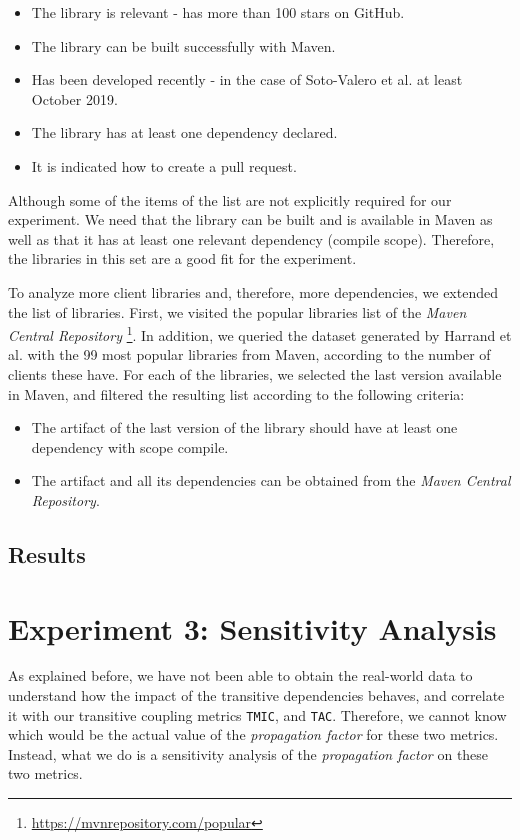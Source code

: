\begin{itemize}
  \item The library is relevant - has more than 100 stars on GitHub.
  \item The library can be built successfully with Maven.
  \item Has been developed recently - in the case of Soto-Valero et al. at least October 2019.
  \item The library has at least one dependency declared.
  \item It is indicated how to create a pull request.
\end{itemize}

Although some of the items of the list are not explicitly required for our experiment. We need that the library can be built and is available in Maven as well as that it has at least one relevant dependency (compile scope). Therefore, the libraries in this set are a good fit for the experiment.

To analyze more client libraries and, therefore, more dependencies, we extended the list of libraries. First, we visited the popular libraries list of the \textit{Maven Central Repository} \footnote{\url{https://mvnrepository.com/popular}}. In addition, we queried the dataset generated by Harrand et al. \cite{Harrand2019} with the 99 most popular libraries from Maven, according to the number of clients these have. For each of the libraries, we selected the last version available in Maven, and filtered the resulting list according to the following criteria:

\begin{itemize}
  \item The artifact of the last version of the library should have at least one dependency with scope compile.
  \item The artifact and all its dependencies can be obtained from the \textit{Maven Central Repository}.
\end{itemize}


\subsection{Results}

\section{Experiment 3: Sensitivity Analysis}
As explained before, we have not been able to obtain the real-world data to understand how the impact of the transitive dependencies behaves, and correlate it with our transitive coupling metrics \texttt{TMIC}, and \texttt{TAC}. Therefore, we cannot know which would be the actual value of the \textit{propagation factor} for these two metrics. Instead, what we do is a sensitivity analysis of the \textit{propagation factor} on these two metrics.


